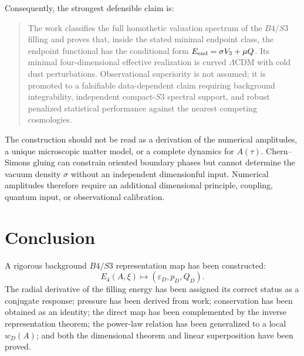 \documentclass[11pt,a4paper]{article}
\def\Bfour{B4}%
\def\Sthree{S3}%
\numberwithin{equation}{section}
\theoremstyle{remark}
\newcommand{\Sthree}{S^3}
\newcommand{\Bfour}{B^4}
\newcommand{\Efour}{E_4}
\newcommand{\epsD}{\varepsilon_D}
\newcommand{\pD}{p_D}
\newcommand{\QD}{Q_D}
\begin{document}
Consequently, the strongest defensible claim is:
\begin{quote}
The work classifies the full homothetic valuation spectrum of the \(\Bfour/\Sthree\) filling and proves that, inside the stated minimal endpoint class, the endpoint functional has the conditional form \(E_{\rm end}=\sigma V_3+\mu Q\). Its minimal four-dimensional effective realization is curved \(\Lambda\)CDM with cold dust perturbations. Observational superiority is not assumed; it is promoted to a falsifiable data-dependent claim requiring background integrability, independent compact-\(\Sthree\) spectral support, and robust penalized statistical performance against the nearest competing cosmologies.
\end{quote}

The construction should not be read as a derivation of the numerical amplitudes, a unique microscopic matter model, or a complete dynamics for \(A(\tau)\). Chern--Simons gluing can constrain oriented boundary phases but cannot determine the vacuum density \(\sigma\) without an independent dimensionful input. Numerical amplitudes therefore require an additional dimensional principle, coupling, quantum input, or observational calibration.

\section{Conclusion}

A rigorous background \(\Bfour/\Sthree\) representation map has been constructed:
\begin{equation}
\Efour(A,\xi)\longmapsto(\epsD,\pD,\QD).
\end{equation}
The radial derivative of the filling energy has been assigned its correct status as a conjugate response; pressure has been derived from work; conservation has been obtained as an identity; the direct map has been complemented by the inverse representation theorem; the power-law relation has been generalized to a local \(w_D(A)\); and both the dimensional theorem and linear superposition have been proved.
\end{document}
